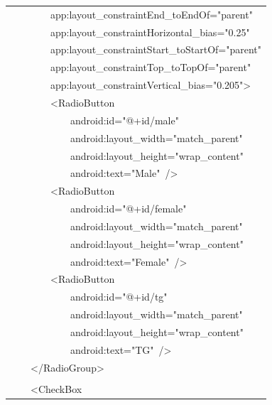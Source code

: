 \documentclass[a4paper,12pt]{article}
\begin{document}
\begin{longtable}{|p{}|}
{\ttfamily\small \ \ \ \ \ \ \ \ app:layout\_constraintEnd\_toEndOf="parent"} \\
{\ttfamily\small \ \ \ \ \ \ \ \ app:layout\_constraintHorizontal\_bias="0.25"} \\
{\ttfamily\small \ \ \ \ \ \ \ \ app:layout\_constraintStart\_toStartOf="parent"} \\
{\ttfamily\small \ \ \ \ \ \ \ \ app:layout\_constraintTop\_toTopOf="parent"} \\
{\ttfamily\small \ \ \ \ \ \ \ \ app:layout\_constraintVertical\_bias="0.205"\textgreater{}} \\
{\ttfamily\small \ \ \ \ \ \ \ \ \textless{}RadioButton} \\
{\ttfamily\small \ \ \ \ \ \ \ \ \ \ \ \ android:id="@+id/male"} \\
{\ttfamily\small \ \ \ \ \ \ \ \ \ \ \ \ android:layout\_width="match\_parent"} \\
{\ttfamily\small \ \ \ \ \ \ \ \ \ \ \ \ android:layout\_height="wrap\_content"} \\
{\ttfamily\small \ \ \ \ \ \ \ \ \ \ \ \ android:text="Male"\ /\textgreater{}} \\
{\ttfamily\small \ \ \ \ \ \ \ \ \textless{}RadioButton} \\
{\ttfamily\small \ \ \ \ \ \ \ \ \ \ \ \ android:id="@+id/female"} \\
{\ttfamily\small \ \ \ \ \ \ \ \ \ \ \ \ android:layout\_width="match\_parent"} \\
{\ttfamily\small \ \ \ \ \ \ \ \ \ \ \ \ android:layout\_height="wrap\_content"} \\
{\ttfamily\small \ \ \ \ \ \ \ \ \ \ \ \ android:text="Female"\ /\textgreater{}} \\
{\ttfamily\small \ \ \ \ \ \ \ \ \textless{}RadioButton} \\
{\ttfamily\small \ \ \ \ \ \ \ \ \ \ \ \ android:id="@+id/tg"} \\
{\ttfamily\small \ \ \ \ \ \ \ \ \ \ \ \ android:layout\_width="match\_parent"} \\
{\ttfamily\small \ \ \ \ \ \ \ \ \ \ \ \ android:layout\_height="wrap\_content"} \\
{\ttfamily\small \ \ \ \ \ \ \ \ \ \ \ \ android:text="TG"\ /\textgreater{}} \\
{\ttfamily\small \ \ \ \ \textless{}/RadioGroup\textgreater{}} \\
\strut \\
{\ttfamily\small \ \ \ \ \textless{}CheckBox} \\

\end{longtable}
\end{document}
